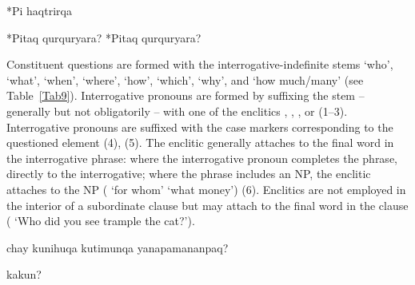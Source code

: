 %
{*\textquestiondown{}Pi haqtrirqa}%
{}%
{}{}%

%
{*\textquestiondown{}Pitaq qurquryara? *\textquestiondown{}Pitaq qurquryara?}%
{}%
{}{}%

Constituent questions are formed with the interrogative-indefinite stems  `who',  `what',  `when',  `where',  `how',  `which',  `why', and  `how much/many' (see Table~\ref{Tab9}). Interrogative pronouns are formed by suffixing the stem -- generally but not obligatorily -- with one of the enclitics , , ,  or  (1--3). Interrogative pronouns are suffixed with the case markers corresponding to the questioned element (4), (5). The enclitic generally attaches to the final word in the interrogative phrase: where the interrogative pronoun completes the phrase, directly to the interrogative; where the phrase includes an NP, the enclitic attaches to the NP ( `for whom'   `what money') (6). Enclitics are not employed in the interior of a subordinate clause but may attach to the final word in the clause (    `Who did you see trample the cat?').

%
{\textquestiondown{} chay kunihuqa kutimunqa yanapamananpaq?}%
{}%
{}{}%

%
{\textquestiondown{} kakun?}%
{}%
{}{}%

